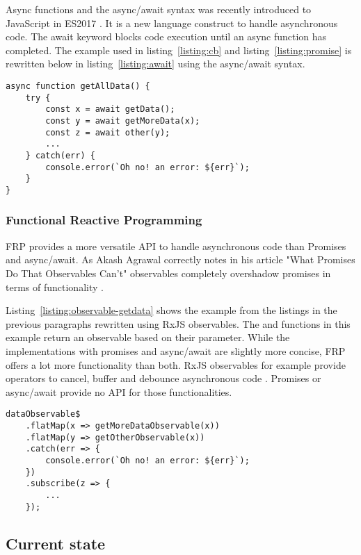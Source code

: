 Async functions and the async/await syntax was recently introduced to JavaScript in ES2017 \cite{async-await}. It is a new language construct to handle asynchronous code. The await keyword blocks code execution until an async function has completed. The example used in listing~\ref{listing:cb} and listing~\ref{listing:promise} is rewritten below in listing~\ref{listing:await} using the async/await syntax. 

\begin{lstlisting}[caption=Fetching data with the async/await keywords,label=listing:await]
async function getAllData() {
	try {
		const x = await getData();
		const y = await getMoreData(x);
		const z = await other(y);
		...
	} catch(err) {
		console.error(`Oh no! an error: ${err}`);
	}
}	
\end{lstlisting}

\subsubsection{Functional Reactive Programming}

FRP provides a more versatile API to handle asynchronous code than Promises and async/await. As Akash Agrawal correctly notes in his article "What Promises Do That Observables Can’t" observables completely overshadow promises in terms of functionality \cite{observables-promises}.

Listing~\ref{listing:observable-getdata} shows the example from the listings in the previous paragraphs rewritten using RxJS observables. The  and  functions in this example return an observable based on their parameter. While the implementations with promises and async/await are slightly more concise, FRP offers a lot more functionality than both. RxJS observables for example provide operators to cancel, buffer and debounce asynchronous code \cite{rxjs-ben}. Promises or async/await provide no API for those functionalities.

\begin{lstlisting}[caption=Fetching data with FRP (RxJS),label=listing:observable-getdata]
dataObservable$
	.flatMap(x => getMoreDataObservable(x))
	.flatMap(y => getOtherObservable(x))
	.catch(err => {
		console.error(`Oh no! an error: ${err}`);
	})
	.subscribe(z => {
		...
	});
\end{lstlisting}

\subsection{Current state}


